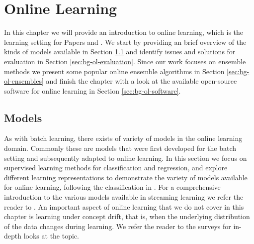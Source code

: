 \chapter{Online Learning}
\label{ch:bg-online-learning}

In this chapter we will provide an introduction to online learning, which is the learning
setting for Papers \boostvhtNum and \uncertaintreesNum. We start by providing an brief
overview of the kinds of models available in Section \ref{sec:bg-ol-models}
and identify issues and solutions for evaluation in Section \ref{sec:bg-ol-evaluation}.
Since our work focuses on ensemble methods we present some popular online ensemble algorithms in Section
\ref{sec:bg-ol-ensembles} and finish the chapter with a look at the available
open-source software for online learning in Section \ref{sec:bg-ol-software}.

\section{Models}
\label{sec:bg-ol-models}

As with batch learning, there exists of variety of models in the online
learning domain. Commonly these are models that were first developed
for the batch setting and subsequently adapted to online learning.
In this section we focus on supervised learning methods for
classification and regression, and explore different
learning representations to demonstrate the variety of
models available for online learning, following the
classification in \cite{onlineML}. For a comprehensive
introduction to the various models available in streaming
learning we refer the reader to \cite{moa-book}.
An important aspect of online learning that we do not cover in this chapter is learning
under concept drift, that is, when the underlying distribution
of the data changes during learning. We refer the reader
to the surveys \cite{concept-drift-survey-indre, concept-drift-survey-gama}
for in-depth looks at the topic.

